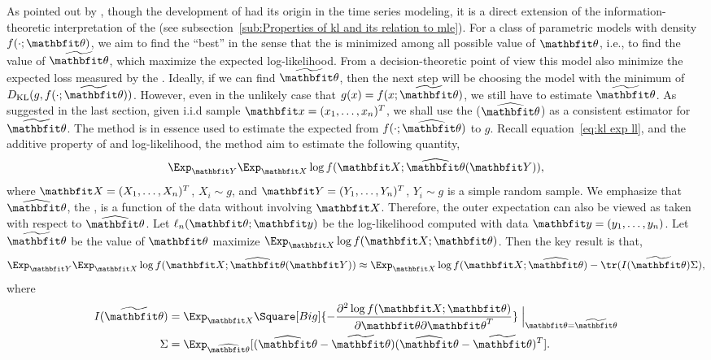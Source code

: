 As pointed out by \textcite{Bozdogan1987}, though the development of \aic had
its origin in the time series modeling, it is a direct extension of the
information-theoretic interpretation of the \mle (see
subsection~\ref{sub:Properties of kl and its relation to mle}). For a class of
parametric models with density $f(\cdot;\bth)$, we aim to find the ``best'' in
the sense that the \kl is minimized among all possible value of $\bth$, i.e.,
to find the value of $\tbth$, which maximize the expected log-likelihood. From
a decision-theoretic point of view this model also minimize the expected loss
measured by the \kl \parencite{Akaike1973}. Ideally, if we can find $\tbth$,
then the next step will be choosing the model with the minimum of
$D_{\mathrm{KL}}(g,f(\cdot;\tbth))$. However, even in the unlikely case that
$g(x) = f(x;\tbth)$, we still have to estimate $\tbth$. As suggested in the
last section, given i.i.d sample $\bfx = (x_1,\dots,x_n)^T$, we shall use the
\mle ($\hbth$) as a consistent estimator for $\tbth$. The \aic method is in
essence used to estimate the expected \kl from $f(\cdot; \hbth)$ to $g$.
Recall equation~\eqref{eq:kl exp ll}, and the additive property of \kl and
log-likelihood, the \aic method aim to estimate the following quantity,
\begin{equation}
  \Exp_{\bfY}\Exp_{\bfX}\log f(\bfX;\hbth(\bfY)),
\end{equation}
where $\bfX = (X_1,\dots,X_n)^T$, $X_i \sim g$, and $\bfY =
(Y_1,\dots,Y_n)^T$, $Y_i \sim g$ is a simple random sample. We emphasize that
$\hbth$, the \mle, is a function of the data without involving $\bfX$.
Therefore, the outer expectation can also be viewed as taken with respect to
$\hbth$. Let $\ell_n(\bth;\bfy)$ be the log-likelihood computed with data
$\bfy = (y_1,\dots,y_n)$. Let $\tbth$ be the value of $\bth$ maximize
$\Exp_{\bfX}\log f(\bfX;\bth)$. Then the key result is that,
\begin{equation}
  \Exp_{\bfY}\Exp_{\bfX}\log f(\bfX;\hbth(\bfY))
  \approx \Exp_{\bfX}\log f(\bfX;\hbth) - \tr(I(\tbth)\Sigma),
  \label{eq:aic general}
\end{equation}
where
\begin{align}
  I(\tbth)
  & = \Exp_{\bfX}\Square[Big]{
    -\frac{\partial^2\log f(\bfX;\bth)}{\partial\bth\partial\bth^T}}
  \Bigm|_{\bth=\tbth} \\
  \Sigma &= \Exp_{\hbth}[(\hbth-\tbth)(\hbth-\tbth)^T].
\end{align}

